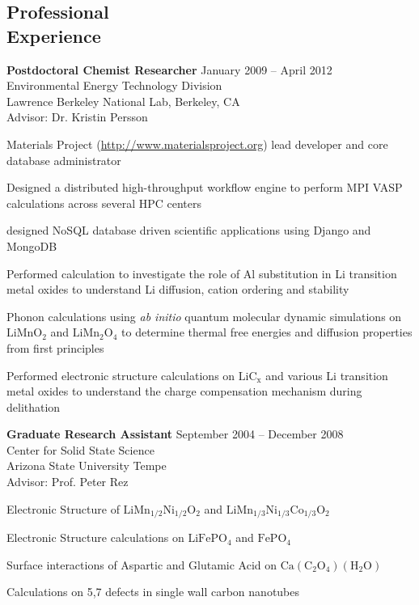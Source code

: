 \documentclass[margin,line]{resume}
\begin{document}
\begin{resume}
       \section{\mysidestyle Professional\\Experience}
    \textbf{Postdoctoral Chemist Researcher} \hfill January 2009 -- April 2012\vspace{1mm}\\
		Environmental Energy Technology Division \\
		Lawrence Berkeley National Lab, Berkeley, CA\\
		Advisor: Dr. Kristin Persson\\\vspace{-1.5mm}
    \begin{list2}
			\item Materials Project (\url{http://www.materialsproject.org}) lead developer and core database administrator
			\item Designed a distributed high-throughput workflow engine to perform MPI VASP calculations across several HPC centers
      \item designed NoSQL database driven scientific applications using Django and MongoDB
		  \item Performed calculation to investigate the role of Al substitution in Li transition metal oxides to understand Li diffusion, cation ordering and stability
		 \item Phonon calculations using \textsl{ab initio} quantum molecular dynamic simulations on $\mathrm{LiMnO_2}$ and $\mathrm{LiMn_2O_4}$ to determine thermal free energies and diffusion properties from first principles
     \item Performed electronic structure calculations on $\mathrm{LiC_x}$ and various Li transition metal oxides to understand the charge compensation mechanism during delithation
		\end{list2}

		\textbf{Graduate Research Assistant} \hfill September 2004 -- December 2008\vspace{1mm}\\
		Center for Solid State Science\\
Arizona State University Tempe\\
Advisor: Prof. Peter Rez\\\vspace{-1.5mm}
		\begin{list2}
			\item Electronic Structure of $\mathrm{LiMn_{1/2}Ni_{1/2}O_2}$ and $\mathrm{LiMn_{1/3}Ni_{1/3}Co_{1/3}O_2}$
			\item Electronic Structure calculations on $\mathrm{LiFePO_4}$ and $\mathrm{FePO_4}$
			\item Surface interactions of Aspartic and Glutamic Acid on $\mathrm{Ca(C_2O_4)(H_2O)}$
			\item Calculations on 5,7 defects in single wall carbon nanotubes
		\end{list2}



\end{resume}
\end{document}
